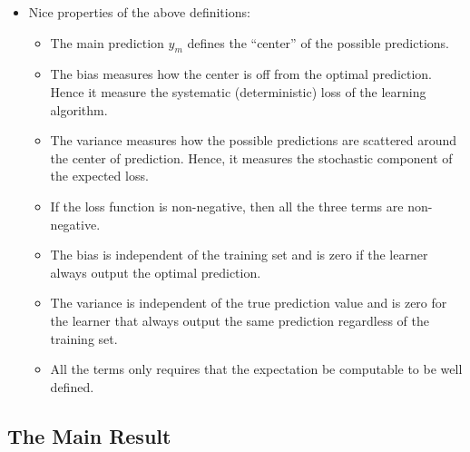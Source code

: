 \documentclass[10pt]{article}
\begin{document}
\begin{itemize}
    \item Nice properties of the above definitions:
    \begin{itemize}
      \item The main prediction $y_m$ defines the ``center'' of the possible predictions.
      \item The bias measures how the center is off from the optimal prediction. Hence it measure the systematic (deterministic) loss of the learning algorithm.
      \item The variance measures how the possible predictions are scattered around the center of prediction. Hence, it measures the stochastic component of the expected loss.
      \item If the loss function is non-negative, then all the three terms are non-negative.
      \item The bias is independent of the training set and is zero if the learner always output the optimal prediction.
      \item The variance is independent of the true prediction value and is zero for the learner that always output the same prediction regardless of the training set.
      \item All the terms only requires that the expectation be computable to be well defined.      
    \end{itemize}        
  \end{itemize}

  \subsection{The Main Result}
\end{document}
